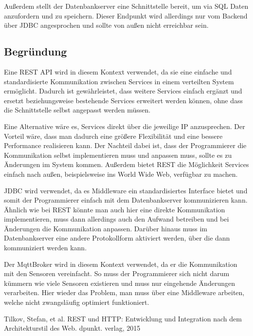 \documentclass[runningheads]{llncs}
\begin{document}
Außerdem stellt der Datenbankserver eine Schnittstelle bereit, um via SQL Daten anzufordern und zu speichern.
Dieser Endpunkt wird allerdings nur vom Backend über JDBC angesprochen und sollte von außen nicht erreichbar sein.

\subsection{Begründung}
Eine  REST API wird in diesem Kontext verwendet, da sie eine einfache und standardisierte Kommunikation zwischen Services in einem verteilten System ermöglicht.
Dadurch ist gewährleistet, dass weitere Services einfach ergänzt und ersetzt beziehungsweise bestehende Services erweitert werden können, ohne dass die Schnittstelle selbst angepasst werden müssen.

Eine Alternative wäre es, Services direkt über die jeweilige IP anzusprechen.
Der Vorteil wäre, dass man dadurch eine größere Flexibilität und eine bessere Performance realisieren kann.
Der Nachteil dabei ist, dass der Programmierer die Kommunikation selbst implementieren muss und anpassen muss, sollte es zu Änderungen im System kommen.
Außerdem bietet REST die Möglichkeit Services einfach nach außen, beispielsweise ins World Wide Web, verfügbar zu machen.

JDBC wird verwendet, da es Middleware ein standardisiertes Interface bietet und somit der Programmierer einfach mit dem Datenbankserver kommunizieren kann.
Ähnlich wie bei REST könnte man auch hier eine direkte Kommunikation implementieren, muss dann allerdings auch den Aufwand betreiben und bei Änderungen die Kommunikation anpassen.
Darüber hinaus muss im Datenbankserver eine andere Protokollform aktiviert werden, über die dann kommuniziert werden kann.

Der MqttBroker wird in diesem Kontext verwendet, da er die Kommunikation mit den Sensoren vereinfacht.
So muss der Programmierer sich nicht darum kümmern wie viele Sensoren existieren und muss nur eingehende Änderungen verarbeiten.
Hier wieder das Problem, man muss über eine Middleware arbeiten, welche nicht zwangsläufig optimiert funktioniert.


\newpage


Tilkov, Stefan, et al. REST und HTTP: Entwicklung und 
Integration nach dem Architekturstil des Web. dpunkt. verlag, 
2015
\end{document}
